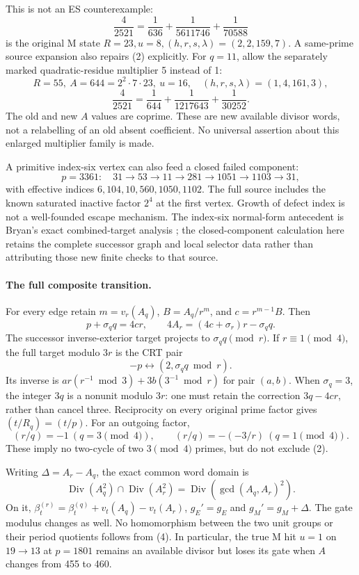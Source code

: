 \documentclass[10pt,a4paper]{article}
\begin{document}
This is not an ES counterexample:
\[
 \frac4{2521}=\frac1{636}+\frac1{5611746}+\frac1{70588}
\]
is the original M state $R=23,u=8,(h,r,s,\lambda)=(2,2,159,7)$.
A same-prime source expansion also repairs (2) explicitly. For $q=11$, allow
the separately marked quadratic-residue multiplier 5 instead of 1:
\[
 R=55,\ A=644=2^2\cdot7\cdot23,\ u=16,
 \quad(h,r,s,\lambda)=(1,4,161,3),
\]
\[
 \boxed{\frac4{2521}=\frac1{644}+\frac1{1217643}+\frac1{30252}.}
\]
The old and new $A$ values are coprime. These are new available divisor words,
not a relabelling of an old absent coefficient. No universal assertion about
this enlarged multiplier family is made.

 A primitive index-six vertex can also feed a closed failed component:
\[
 p=3361:\quad31\to53\to11\to281\to1051\to1103\to31,
\]
 with effective indices $6,104,10,560,1050,1102$. The full source includes the
 known saturated inactive factor $2^4$ at the first vertex. Growth of defect
 index is not a well-founded escape mechanism. The index-six normal-form
 antecedent is Bryan's exact combined-target analysis \cite[\S\S3--8]{BryanSix};
 the closed-component calculation here retains the complete successor graph and
 local selector data rather than attributing those new finite checks to that source.

\newpage
\paragraph{The full composite transition.}
For every edge retain $m=v_r(A_q)$, $B=A_q/r^m$, and $c=r^{m-1}B$.
Then
\[
 p+\sigma_q q=4cr,\qquad
 \boxed{4A_r=(4c+\sigma_r)r-\sigma_q q.}                  \tag{4}
\]
The successor inverse-exterior target projects to $\sigma_q q\pmod r$.
If $r\equiv1\pmod4$, the full target modulo $3r$ is the CRT pair
\[
 \boxed{-p\longleftrightarrow(2,\sigma_q q\bmod r).}       \tag{5}
\]
Its inverse is $ar(r^{-1}\bmod3)+3b(3^{-1}\bmod r)$ for pair $(a,b)$.
When $\sigma_q=3$, the integer $3q$ is a nonunit modulo $3r$:
one must retain the correction $3q-4cr$, rather than cancel three.
Reciprocity on every original prime factor gives $(t/R_q)=(t/p)$.
For an outgoing factor,
\[
 (r/q)=-1\ (q=3\pmod4),\qquad
 (r/q)=-(-3/r)\ (q=1\pmod4).
\]
These imply no two-cycle of two $3\pmod4$ primes, but do not exclude (2).

Writing $\Delta=A_r-A_q$, the exact common word domain is
\[
 \operatorname{Div}(A_q^2)\cap\operatorname{Div}(A_r^2)
 =\operatorname{Div}(\gcd(A_q,A_r)^2).
\]
On it, $\beta_t^{(r)}=\beta_t^{(q)}+v_t(A_q)-v_t(A_r)$,
$g_E'=g_E$ and $g_M'=g_M+\Delta$. The gate modulus changes as well.
No homomorphism between the two unit groups or their period quotients follows
from (4). In particular, the true M hit $u=1$ on $19\to13$ at $p=1801$
remains an available divisor but loses its gate when $A$ changes from 455 to 460.
\end{document}
